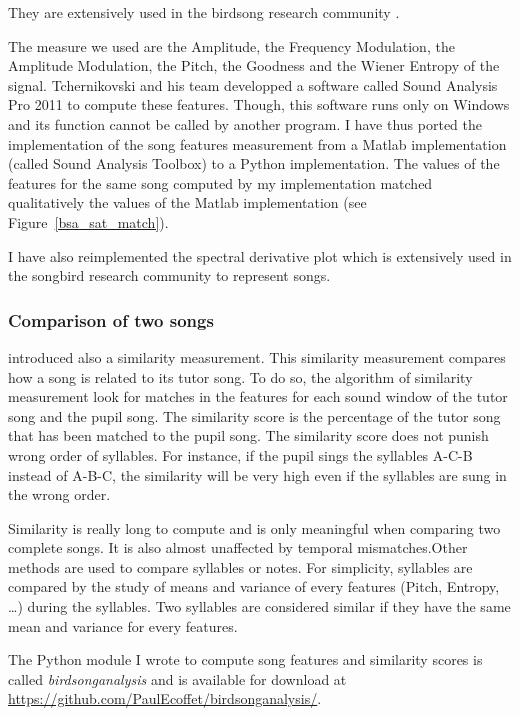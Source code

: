 \documentclass{report}
\begin{document}
They are extensively used in the birdsong research community
\parencite{coen_learning_2007, deregnaucourt_how_2005, lipkind_stepwise_2013,
liu_juvenile_2004}.

The measure we used are the Amplitude, the Frequency Modulation, the Amplitude
Modulation, the Pitch, the Goodness and the Wiener Entropy of the signal.
Tchernikovski and his team developped a software called Sound Analysis Pro 2011
to compute these features. Though, this software runs only on Windows and its
function cannot be called by another program. I have thus ported the
implementation of the song features measurement from a Matlab implementation
(called Sound Analysis Toolbox) to a Python implementation. The values of the
features for the same song computed by my implementation matched qualitatively
the values of the Matlab implementation (see Figure~\ref{bsa_sat_match}).

I have also reimplemented the spectral derivative plot which is
extensively used in the songbird research community to represent songs.


\subsubsection{Comparison of two songs}

\textcite{tchernichovski_procedure_2000} introduced also a similarity
measurement. This similarity measurement compares how a song is related to its
tutor song. To do so, the algorithm of similarity measurement look for matches
in the features for each sound window of the tutor song and the pupil song. The
similarity score is the percentage of the tutor song that has been matched to
the pupil song. The similarity score does not punish wrong order of syllables.
For instance, if the pupil sings the syllables A-C-B instead of A-B-C, the
similarity will be very high even if the syllables are sung in the wrong order.

Similarity is really long to compute and is only meaningful when comparing two
complete songs. It is also almost unaffected by temporal mismatches.Other
methods are used to compare syllables or notes. For simplicity, syllables are
compared by the study of means and variance of every features (Pitch, Entropy,
\ldots{}) during the syllables. Two syllables are considered similar if they
have the same mean and variance for every features.

The Python module I wrote to compute song features and similarity scores is
called \emph{birdsonganalysis} and is available for download at
\url{https://github.com/PaulEcoffet/birdsonganalysis/}.
\end{document}
